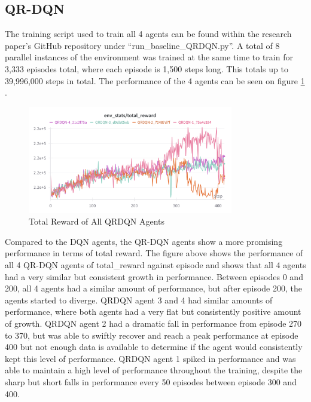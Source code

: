\subsection{QR-DQN}

The training script used to train all 4 agents can be found within the research paper's GitHub repository under ``run\_baseline\_QRDQN.py''. A total of 8 parallel instances of the environment was trained at the same time to train for 3,333 episodes total, where each episode is 1,500 steps long. This totals up to 39,996,000 steps in total. The performance of the 4 agents can be seen on figure \ref{fig:agent_eval_all_qrdqn} . 

\begin{figure}[H]
    \centering
    \includegraphics[width=0.8\textwidth]{figures/QRDQN_TotalReward.png}
    \caption{Total Reward of All QRDQN Agents}
    \label{fig:agent_eval_all_qrdqn}
\end{figure}

Compared to the DQN agents, the QR-DQN agents show a more promising performance in terms of total reward. The figure above shows the performance of all 4 QR-DQN agents of total\_reward against episode and shows that all 4 agents had a very similar but consistent growth in performance. Between episodes 0 and 200, all 4 agents had a similar amount of performance, but after episode 200, the agents started to diverge. QRDQN agent 3 and 4 had similar amounts of performance, where both agents had a very flat but consistently positive amount of growth. QRDQN agent 2 had a dramatic fall in performance from episode 270 to 370, but was able to swiftly recover and reach a peak performance at episode 400 but not enough data is available to determine if the agent would consistently kept this level of performance. QRDQN agent 1 spiked in performance and was able to maintain a high level of performance throughout the training, despite the sharp but short falls in performance every 50 episodes between episode 300 and 400. 

